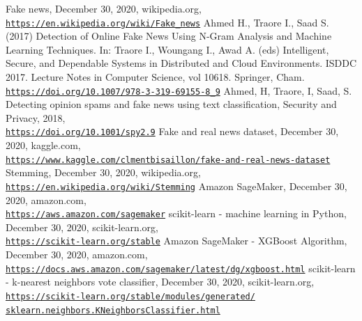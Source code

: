 \documentclass[a4paper,12pt,nottoc]{article}
\begin{document}
\clearpage
\begin{thebibliography}{9}
 Fake news, December 30, 2020, wikipedia.org, \\\href{https://en.wikipedia.org/wiki/Fake_news}{\texttt{https://en.wikipedia.org/wiki/Fake\_news}}
 Ahmed H., Traore I., Saad S. (2017) Detection of Online Fake News Using N-Gram Analysis and Machine Learning Techniques. In: Traore I., Woungang I., Awad A. (eds) Intelligent, Secure, and Dependable Systems in Distributed and Cloud Environments. ISDDC 2017. Lecture Notes in Computer Science, vol 10618. Springer, Cham. \\\href{https://doi.org/10.1007/978-3-319-69155-8_9}{\texttt{https://doi.org/10.1007/978-3-319-69155-8\_9}}
 Ahmed, H, Traore, I, Saad, S. Detecting opinion spams and fake news using text classification, Security and Privacy, 2018, \\\href{https://doi.org/10.1001/spy2.9}{\texttt{https://doi.org/10.1001/spy2.9}}
 Fake and real news dataset, December 30, 2020, kaggle.com, \\\href{https://www.kaggle.com/clmentbisaillon/fake-and-real-news-dataset}{\texttt{https://www.kaggle.com/clmentbisaillon/fake-and-real-news-dataset}}
 Stemming, December 30, 2020, wikipedia.org, \\\href{https://en.wikipedia.org/wiki/Stemming}{\texttt{https://en.wikipedia.org/wiki/Stemming}}
 Amazon SageMaker, December 30, 2020, amazon.com, \\\href{https://aws.amazon.com/sagemaker}{\texttt{https://aws.amazon.com/sagemaker}}
 scikit-learn - machine learning in Python, December 30, 2020, scikit-learn.org, \\\href{https://scikit-learn.org/stable}{\texttt{https://scikit-learn.org/stable}}
 Amazon SageMaker - XGBoost Algorithm, December 30, 2020, amazon.com, \\\href{https://docs.aws.amazon.com/sagemaker/latest/dg/xgboost.html}{\texttt{https://docs.aws.amazon.com/sagemaker/latest/dg/xgboost.html}}
 scikit-learn - k-nearest neighbors vote classifier, December 30, 2020, scikit-learn.org, \\\href{https://scikit-learn.org/stable/modules/generated/sklearn.neighbors.KNeighborsClassifier.html}{\texttt{https://scikit-learn.org/stable/modules/generated/\\sklearn.neighbors.KNeighborsClassifier.html}}

\end{thebibliography}
\end{document}
